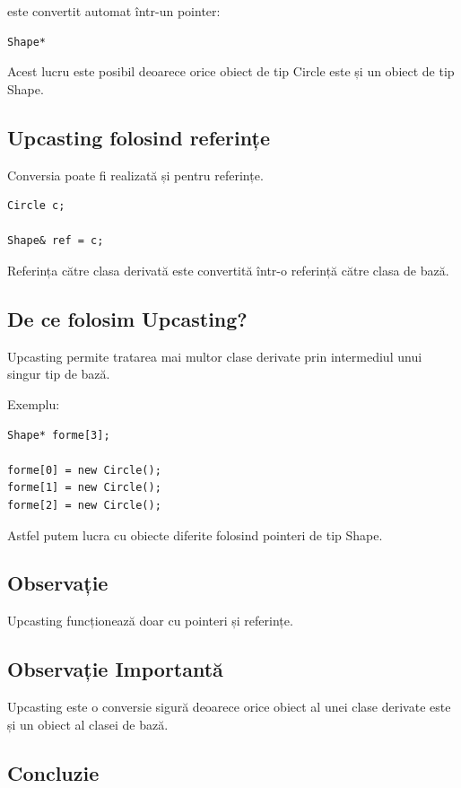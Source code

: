 \documentclass[12pt,a4paper]{article}
\begin{document}
este convertit automat într-un pointer:

\begin{verbatim}
Shape*
\end{verbatim}

Acest lucru este posibil deoarece orice obiect de tip Circle este și un obiect de tip Shape.

\subsection{Upcasting folosind referințe}

Conversia poate fi realizată și pentru referințe.

\begin{verbatim}
Circle c;

Shape& ref = c;
\end{verbatim}

Referința către clasa derivată este convertită într-o referință către clasa de bază.

\subsection{De ce folosim Upcasting?}

Upcasting permite tratarea mai multor clase derivate prin intermediul unui singur tip de bază.

Exemplu:

\begin{verbatim}
Shape* forme[3];

forme[0] = new Circle();
forme[1] = new Circle();
forme[2] = new Circle();
\end{verbatim}

Astfel putem lucra cu obiecte diferite folosind pointeri de tip Shape.

\subsection{Observație}

Upcasting funcționează doar cu pointeri și referințe.

\subsection{Observație Importantă}

Upcasting este o conversie sigură deoarece orice obiect al unei clase derivate este și un obiect al clasei de bază.

\subsection{Concluzie}
\end{document}
